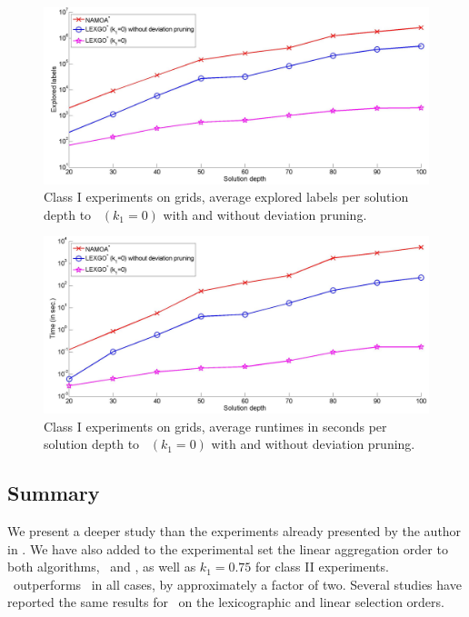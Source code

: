 \begin{figure}
\centering
\includegraphics[width=1\textwidth]{Images/Chapter6/dev-pruning-labels0}
\caption{Class I experiments on grids, average explored labels per solution depth to \lexgo \ $(k_1 = 0)$ with and without deviation pruning.}
\label{fig:6-7}
\end{figure}

\begin{figure}
\centering
\includegraphics[width=1\textwidth]{Images/Chapter6/dev-pruning-exe0}
\caption{Class I experiments on grids, average runtimes in seconds per solution depth to \lexgo \ $(k_1 = 0)$ with and without deviation pruning.}
\label{fig:6-8}
\end{figure}

\subsection{Summary}
\label{chapEmpiricalAnalysis:subsec:summarygridslexgo}

We present a deeper study than the experiments already presented by the author in \citet{Pulido2014}. We have also added to the experimental set the linear aggregation order to both algorithms, \namoa \ and \lexgo, as well as $k_1=0.75$ for class II experiments. \namoalin \ outperforms \namoalex \ in all cases, by approximately a factor of two. Several studies have reported the same results for \namoa \ on the lexicographic and linear selection orders.  

